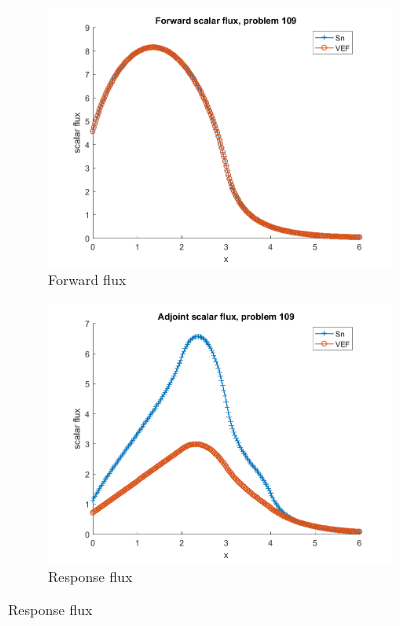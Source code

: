 \documentclass{article}
\begin{document}
\begin{figure}[H]
\label{Case109Flux}
\centering
\begin{subfigure}{.5\textwidth}
  \centering
  \includegraphics[width=.98\linewidth]{IanProposal/figures2/109phi.png}
  \caption{Forward flux}
  \label{fig:sfig1}
\end{subfigure}%
\begin{subfigure}{.5\textwidth}
  \centering
  \includegraphics[width=.98\linewidth]{IanProposal/figures2/109phia.png}
  \caption{Response flux}
  \label{fig:sfig4}
\end{subfigure}%
\end{figure}
\end{document}
